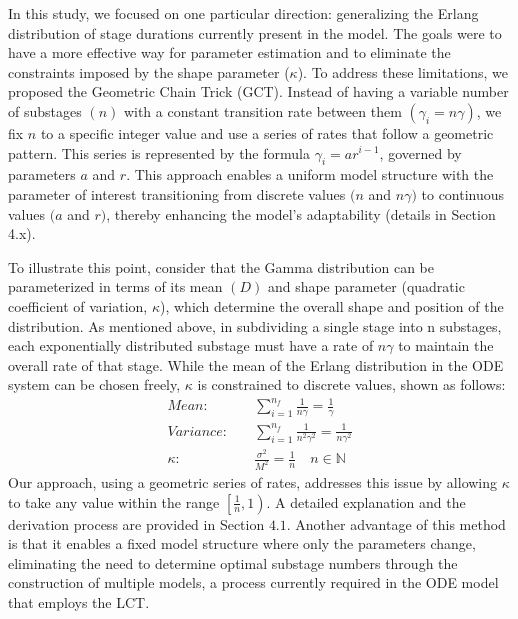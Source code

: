 \documentclass[12pt]{article}
\begin{document}
In this study, we focused on one particular direction: generalizing the Erlang distribution of stage durations currently present in the model. The goals were to have a more effective way for parameter estimation and to eliminate the constraints imposed by the shape parameter ($\kappa$). To address these limitations, we proposed the Geometric Chain Trick (GCT). Instead of having a variable number of substages $(n)$ with a constant transition rate between them $(\gamma_i = n\gamma)$, we fix $n$ to a specific integer value and use a series of rates that follow a geometric pattern. This series is represented by the formula $\gamma_i = ar^{i-1}$, governed by parameters $a$ and $r$. This approach enables a uniform model structure with the parameter of interest transitioning from discrete values $(n$ and $n\gamma)$ to continuous values $(a$ and $r)$, thereby enhancing the model's adaptability (details in Section 4.x).

To illustrate this point, consider that the Gamma distribution can be parameterized in terms of its mean $(D)$ and shape parameter (quadratic coefficient of variation, $\kappa$), which determine the overall shape and position of the distribution. As mentioned above, in subdividing a single stage into n substages, each exponentially distributed substage must have a rate of $n\gamma$ to maintain the overall rate of that stage. While the mean of the Erlang distribution in the ODE system can be chosen freely, $\kappa$ is constrained to discrete values, shown as follows:
\begin{align*}
    Mean: \quad &\sum_{i=1}^{n_f} \frac{1}{n\gamma} = \frac{1}{\gamma}\\
    Variance: \quad &\sum_{i=1}^{n_f} \frac{1}{n^2\gamma^2} = \frac{1}{n\gamma^2} \\
    \kappa: \quad &\frac{\sigma^2}{M^2} = \frac{1}{n} \quad n \in \mathbb{N}
\end{align*}
Our approach, using a geometric series of rates, addresses this issue by allowing $\kappa$ to take any value within the range $\left[ \frac{1}{n}, 1 \right)$. A detailed explanation and the derivation process are provided in Section $4.1$. Another advantage of this method is that it enables a fixed model structure where only the parameters change, eliminating the need to determine optimal substage numbers through the construction of multiple models, a process currently required in the ODE model that employs the LCT.
\end{document}
